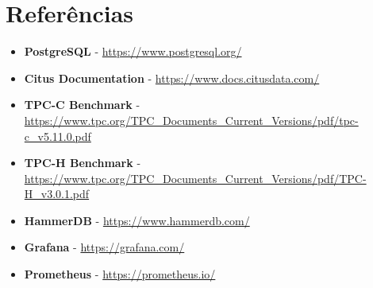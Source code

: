 \section{Referências}
\begin{itemize}
	\item \textbf{PostgreSQL} - \url{https://www.postgresql.org/}
	\item \textbf{Citus Documentation} - \url{https://www.docs.citusdata.com/}
	\item \textbf{TPC-C Benchmark} - \url{https://www.tpc.org/TPC_Documents_Current_Versions/pdf/tpc-c_v5.11.0.pdf}
	\item \textbf{TPC-H Benchmark} - \url{https://www.tpc.org/TPC_Documents_Current_Versions/pdf/TPC-H_v3.0.1.pdf}
	\item \textbf{HammerDB} - \url{https://www.hammerdb.com/}
	\item \textbf{Grafana} - \url{https://grafana.com/}
	\item \textbf{Prometheus} - \url{https://prometheus.io/}
\end{itemize}
